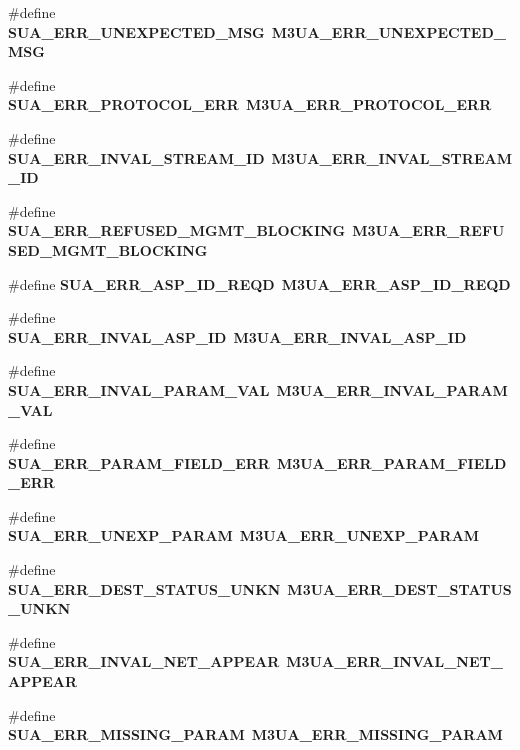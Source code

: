 \begin{DoxyCompactItemize}
\item 
\#define {\bf S\+U\+A\+\_\+\+E\+R\+R\+\_\+\+U\+N\+E\+X\+P\+E\+C\+T\+E\+D\+\_\+\+M\+SG}~{\bf M3\+U\+A\+\_\+\+E\+R\+R\+\_\+\+U\+N\+E\+X\+P\+E\+C\+T\+E\+D\+\_\+\+M\+SG}
\item 
\#define {\bf S\+U\+A\+\_\+\+E\+R\+R\+\_\+\+P\+R\+O\+T\+O\+C\+O\+L\+\_\+\+E\+RR}~{\bf M3\+U\+A\+\_\+\+E\+R\+R\+\_\+\+P\+R\+O\+T\+O\+C\+O\+L\+\_\+\+E\+RR}
\item 
\#define {\bf S\+U\+A\+\_\+\+E\+R\+R\+\_\+\+I\+N\+V\+A\+L\+\_\+\+S\+T\+R\+E\+A\+M\+\_\+\+ID}~{\bf M3\+U\+A\+\_\+\+E\+R\+R\+\_\+\+I\+N\+V\+A\+L\+\_\+\+S\+T\+R\+E\+A\+M\+\_\+\+ID}
\item 
\#define {\bf S\+U\+A\+\_\+\+E\+R\+R\+\_\+\+R\+E\+F\+U\+S\+E\+D\+\_\+\+M\+G\+M\+T\+\_\+\+B\+L\+O\+C\+K\+I\+NG}~{\bf M3\+U\+A\+\_\+\+E\+R\+R\+\_\+\+R\+E\+F\+U\+S\+E\+D\+\_\+\+M\+G\+M\+T\+\_\+\+B\+L\+O\+C\+K\+I\+NG}
\item 
\#define {\bf S\+U\+A\+\_\+\+E\+R\+R\+\_\+\+A\+S\+P\+\_\+\+I\+D\+\_\+\+R\+E\+QD}~{\bf M3\+U\+A\+\_\+\+E\+R\+R\+\_\+\+A\+S\+P\+\_\+\+I\+D\+\_\+\+R\+E\+QD}
\item 
\#define {\bf S\+U\+A\+\_\+\+E\+R\+R\+\_\+\+I\+N\+V\+A\+L\+\_\+\+A\+S\+P\+\_\+\+ID}~{\bf M3\+U\+A\+\_\+\+E\+R\+R\+\_\+\+I\+N\+V\+A\+L\+\_\+\+A\+S\+P\+\_\+\+ID}
\item 
\#define {\bf S\+U\+A\+\_\+\+E\+R\+R\+\_\+\+I\+N\+V\+A\+L\+\_\+\+P\+A\+R\+A\+M\+\_\+\+V\+AL}~{\bf M3\+U\+A\+\_\+\+E\+R\+R\+\_\+\+I\+N\+V\+A\+L\+\_\+\+P\+A\+R\+A\+M\+\_\+\+V\+AL}
\item 
\#define {\bf S\+U\+A\+\_\+\+E\+R\+R\+\_\+\+P\+A\+R\+A\+M\+\_\+\+F\+I\+E\+L\+D\+\_\+\+E\+RR}~{\bf M3\+U\+A\+\_\+\+E\+R\+R\+\_\+\+P\+A\+R\+A\+M\+\_\+\+F\+I\+E\+L\+D\+\_\+\+E\+RR}
\item 
\#define {\bf S\+U\+A\+\_\+\+E\+R\+R\+\_\+\+U\+N\+E\+X\+P\+\_\+\+P\+A\+R\+AM}~{\bf M3\+U\+A\+\_\+\+E\+R\+R\+\_\+\+U\+N\+E\+X\+P\+\_\+\+P\+A\+R\+AM}
\item 
\#define {\bf S\+U\+A\+\_\+\+E\+R\+R\+\_\+\+D\+E\+S\+T\+\_\+\+S\+T\+A\+T\+U\+S\+\_\+\+U\+N\+KN}~{\bf M3\+U\+A\+\_\+\+E\+R\+R\+\_\+\+D\+E\+S\+T\+\_\+\+S\+T\+A\+T\+U\+S\+\_\+\+U\+N\+KN}
\item 
\#define {\bf S\+U\+A\+\_\+\+E\+R\+R\+\_\+\+I\+N\+V\+A\+L\+\_\+\+N\+E\+T\+\_\+\+A\+P\+P\+E\+AR}~{\bf M3\+U\+A\+\_\+\+E\+R\+R\+\_\+\+I\+N\+V\+A\+L\+\_\+\+N\+E\+T\+\_\+\+A\+P\+P\+E\+AR}
\item 
\#define {\bf S\+U\+A\+\_\+\+E\+R\+R\+\_\+\+M\+I\+S\+S\+I\+N\+G\+\_\+\+P\+A\+R\+AM}~{\bf M3\+U\+A\+\_\+\+E\+R\+R\+\_\+\+M\+I\+S\+S\+I\+N\+G\+\_\+\+P\+A\+R\+AM}

\end{DoxyCompactItemize}
